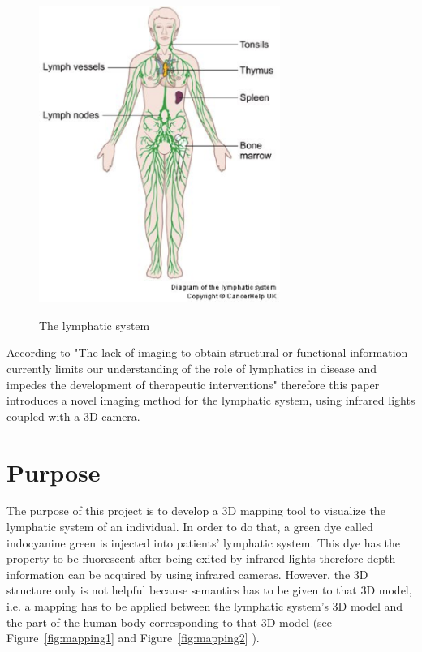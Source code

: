 \begin{figure}[h]
\caption{The lymphatic system}
\centering
    \includegraphics[width=0.7\textwidth]{images/LymphaticSystem.png}
\label{fig:The lymphatic system}
\end{figure}


According to \cite{marshall_near-infrared_2010}  "The lack of imaging to obtain structural or functional information currently limits our understanding of the role of lymphatics in disease and impedes the development of therapeutic interventions" therefore this paper introduces a novel imaging method for the lymphatic system, using infrared lights coupled with a 3D camera.

\section{Purpose}

The purpose of this project is to develop a 3D mapping tool to visualize the lymphatic system of an individual. In order to do that, a green dye called indocyanine green is injected into patients' lymphatic system. This dye has the property to be fluorescent after being exited by infrared lights therefore depth information can be acquired by using infrared cameras. However, the 3D structure only is not helpful because semantics has to be given to that 3D model, i.e. a mapping has to be applied between the lymphatic system's 3D model and the part of the human body corresponding to that 3D model (see Figure~\ref{fig:mapping1} and Figure~\ref{fig:mapping2} \cite{gianluca}). 

